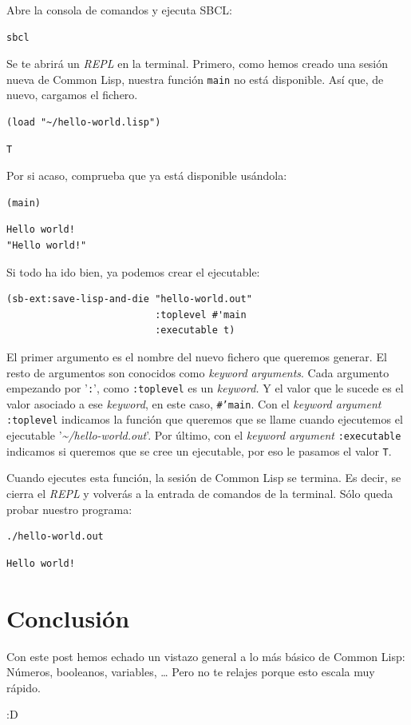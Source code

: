 \documentclass[11pt]{article}
\begin{document}
Abre la consola de comandos y ejecuta SBCL:

\begin{verbatim}
sbcl
\end{verbatim}

Se te abrirá un \emph{REPL} en la terminal. Primero, como hemos creado una sesión nueva de Common Lisp, nuestra función \texttt{main} no está disponible. Así que, de nuevo, cargamos el fichero.

\begin{verbatim}
(load "~/hello-world.lisp")
\end{verbatim}

\begin{verbatim}
T
\end{verbatim}


Por si acaso, comprueba que ya está disponible usándola:

\begin{verbatim}
(main)
\end{verbatim}

\begin{verbatim}
Hello world!
"Hello world!"
\end{verbatim}


Si todo ha ido bien, ya podemos crear el ejecutable:

\begin{verbatim}
(sb-ext:save-lisp-and-die "hello-world.out" 
                          :toplevel #'main 
                          :executable t)
\end{verbatim}

El primer argumento es el nombre del nuevo fichero que queremos generar. El resto de argumentos son conocidos como \emph{keyword arguments}. Cada argumento empezando por '\texttt{:}', como \texttt{:toplevel} es un \emph{keyword.} Y el valor que le sucede es el valor asociado a ese \emph{keyword}, en este caso, \texttt{\#'main}. Con el \emph{keyword argument} \texttt{:toplevel} indicamos la función que queremos que se llame cuando ejecutemos el ejecutable '\emph{\textasciitilde{}​/​hello-world.out}'. Por último, con el \emph{keyword argument} \texttt{:executable} indicamos si queremos que se cree un ejecutable, por eso le pasamos el valor \texttt{T}.

Cuando ejecutes esta función, la sesión de Common Lisp se termina. Es decir, se cierra el \emph{REPL} y volverás a la entrada de comandos de la terminal. Sólo queda probar nuestro programa:

\begin{verbatim}
./hello-world.out
\end{verbatim}

\begin{verbatim}
Hello world!
\end{verbatim}

\section{Conclusión}
\label{sec:orgb01687d}

Con este post hemos echado un vistazo general a lo más básico de Common Lisp: Números, booleanos, variables, \ldots{} Pero no te relajes porque esto escala muy rápido. 

:D
\end{document}
